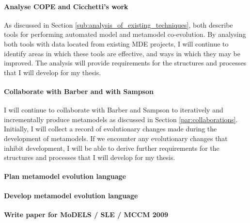 

\paragraph{Analyse COPE and Cicchetti's work} %
\label{par:analyse_existing_work}
As discussed in Section \ref{sub:analysis_of_existing_techniques}, \cite{herrmannsdoerfer08cope,cicchetti08automating} both describe tools for performing automated model and metamodel co-evolution. By analysing both tools with data located from existing MDE projects, I will continue to identify areas in which these tools are effective, and ways in which they may be improved. The analysis will provide requirements for the structures and processes that I will develop for my thesis.



\paragraph{Collaborate with Barber and with Sampson} %
\label{par:collaborate_with_barber_and_with_sampson}
I will continue to collaborate with Barber and Sampson to iteratively and incrementally produce metamodels as discussed in Section \ref{par:collaborations}. Initially, I will collect a record of evolutionary changes made during the development of metamodels. If we encounter any evolutionary changes that inhibit development, I will be able to derive further requirements for the structures and processes that I will develop for my thesis.



\paragraph{Plan metamodel evolution language} %
\label{par:plan_metaamodel_evolution_language}



\paragraph{Develop metamodel evolution language} %
\label{par:develop_metamodel_evolution_language}



\paragraph{Write paper for MoDELS / SLE / MCCM 2009} %
\label{par:write_paper_for_models_sle_mccm_2009}

